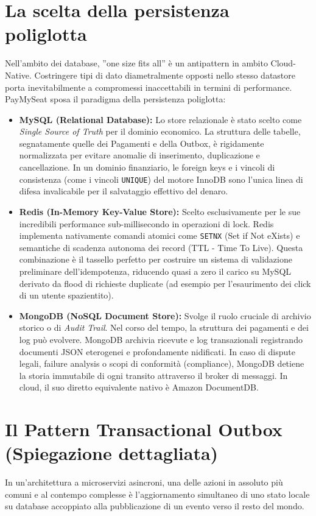 \documentclass[11pt,a4paper]{report}
\begin{document}
\section{La scelta della persistenza poliglotta}
Nell'ambito dei database, ''one size fits all'' \`e un antipattern in ambito Cloud-Native. Costringere tipi di dato diametralmente opposti nello stesso datastore porta inevitabilmente a compromessi inaccettabili in termini di performance. PayMySeat sposa il paradigma della persistenza poliglotta:

\begin{itemize}
    \item \textbf{MySQL (Relational Database):} Lo store relazionale \`e stato scelto come \textit{Single Source of Truth} per il dominio economico. La struttura delle tabelle, segnatamente quelle dei Pagamenti e della Outbox, \`e rigidamente normalizzata per evitare anomalie di inserimento, duplicazione e cancellazione. In un dominio finanziario, le foreign keys e i vincoli di consistenza (come i vincoli \texttt{UNIQUE}) del motore InnoDB sono l'unica linea di difesa invalicabile per il salvataggio effettivo del denaro.
    \item \textbf{Redis (In-Memory Key-Value Store):} Scelto esclusivamente per le sue incredibili performance sub-millisecondo in operazioni di lock. Redis implementa nativamente comandi atomici come \texttt{SETNX} (Set if Not eXists) e semantiche di scadenza autonoma dei record (TTL - Time To Live). Questa combinazione \`e il tassello perfetto per costruire un sistema di validazione preliminare dell'idempotenza, riducendo quasi a zero il carico su MySQL derivato da flood di richieste duplicate (ad esempio per l'esaurimento dei click di un utente spazientito).
    \item \textbf{MongoDB (NoSQL Document Store):} Svolge il ruolo cruciale di archivio storico o di \textit{Audit Trail}. Nel corso del tempo, la struttura dei pagamenti e dei log pu\`o evolvere. MongoDB archivia ricevute e log transazionali registrando documenti JSON eterogenei e profondamente nidificati. In caso di dispute legali, failure analysis o scopi di conformit\`a (compliance), MongoDB detiene la storia immutabile di ogni transito attraverso il broker di messaggi. In cloud, il suo diretto equivalente nativo \`e Amazon DocumentDB.
\end{itemize}

\section{Il Pattern Transactional Outbox (Spiegazione dettagliata)}
In un'architettura a microservizi asincroni, una delle azioni in assoluto pi\`u comuni e al contempo complesse \`e l'aggiornamento simultaneo di uno stato locale su database accoppiato alla pubblicazione di un evento verso il resto del mondo.
\end{document}
